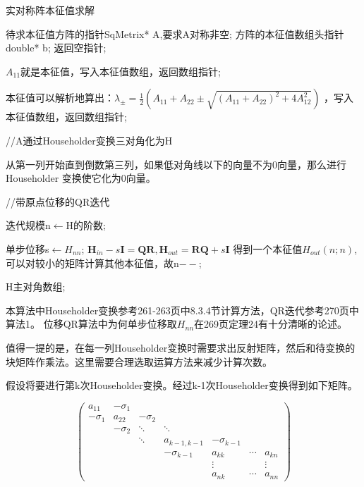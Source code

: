 \documentclass[10pt, a4paper]{article}
\begin{document}
    \begin{algorithm}[H]  
        \caption{实对称阵本征值求解}  
        \label{alg:实对称阵本征值求解}  
        \begin{algorithmic}[1]  
        \Require  
            待求本征值方阵的指针SqMetrix* A,要求A对称非空; 
        \Ensure  
            方阵的本征值数组头指针double* b;
            \State 返回空指针;
        \EndIf
                    
        \State $A_{11}$就是本征值，写入本征值数组，返回数组指针;
        \EndIf

        \State 本征值可以解析地算出：$\lambda_{\pm}=\frac{1}{2}(A_{11}+A_{22}\pm\sqrt{(A_{11}+A_{22})^2+4A_{12}^2})$
        ，写入本征值数组，返回数组指针;
        \EndIf

        \State //A通过Householder变换三对角化为H

        \State 从第一列开始直到倒数第三列，如果低对角线以下的向量不为0向量，那么进行Householder
        变换使它化为0向量。

        \State //带原点位移的QR迭代

        \State 迭代规模n$\leftarrow $H的阶数;

            \State 单步位移s$\leftarrow H_{nn}$;
            \State $\mathbf{H}_{in}-s\mathbf{I}=\mathbf{QR},\mathbf{H}_{out}=\mathbf{RQ}+s\mathbf{I}$
                \State 得到一个本征值$H_{out}(n;n)$,可以对较小的矩阵计算其他本征值，故n$--$;
            \EndIf
        \EndWhile

        \State\Return H主对角数组;
        \end{algorithmic}  
      \end{algorithm}

      本算法中Householder变换参考\cite{ref1}261-263页中8.3.4节计算方法，QR迭代参考\cite{ref1}270页中算法1。
      位移QR算法中为何单步位移取$H_{nn}$在\cite{ref1}269页定理24有十分清晰的论述。

      值得一提的是，在每一列Householder变换时需要求出反射矩阵，然后和待变换的块矩阵作乘法。这里需要合理选取运算方法来减少计算次数。

      假设将要进行第k次Householder变换。经过k-1次Householder变换得到如下矩阵。

      \[
          \begin{pmatrix}
              a_{11}&-\sigma_1& & & & & \\
              -\sigma_1&a_{22}&-\sigma_2& & & &\\
               &-\sigma_2&\ddots &\ddots & & &\\
              & & \ddots& a_{k-1,k-1}& -\sigma_{k-1}& & \\
               & & & -\sigma_{k-1}& a_{kk}&\cdots &a_{kn}\\
               & & & & \vdots & &\vdots \\
               & & & & a_{nk} &\cdots & a_{nn}
          \end{pmatrix}
      \]
\end{document}
